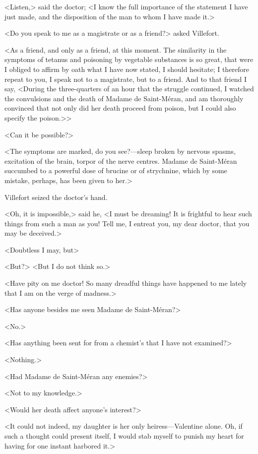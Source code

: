  <Listen,> said the doctor; <I know the full importance of the statement I have just made, and the disposition of the man to whom I have made it.> 

 <Do you speak to me as a magistrate or as a friend?> asked Villefort. 

 <As a friend, and only as a friend, at this moment. The similarity in the symptoms of tetanus and poisoning by vegetable substances is so great, that were I obliged to affirm by oath what I have now stated, I should hesitate; I therefore repeat to you, I speak not to a magistrate, but to a friend. And to that friend I say, <During the three-quarters of an hour that the struggle continued, I watched the convulsions and the death of Madame de Saint-Méran, and am thoroughly convinced that not only did her death proceed from poison, but I could also specify the poison.>> 

 <Can it be possible?> 

 <The symptoms are marked, do you see?—sleep broken by nervous spasms, excitation of the brain, torpor of the nerve centres. Madame de Saint-Méran succumbed to a powerful dose of brucine or of strychnine, which by some mistake, perhaps, has been given to her.> 

 Villefort seized the doctor's hand. 

 <Oh, it is impossible,> said he, <I must be dreaming! It is frightful to hear such things from such a man as you! Tell me, I entreat you, my dear doctor, that you may be deceived.> 

 <Doubtless I may, but\longdash> 

 <But?>  <But I do not think so.> 

 <Have pity on me doctor! So many dreadful things have happened to me lately that I am on the verge of madness.> 

 <Has anyone besides me seen Madame de Saint-Méran?> 

 <No.> 

 <Has anything been sent for from a chemist's that I have not examined?> 

 <Nothing.> 

 <Had Madame de Saint-Méran any enemies?> 

 <Not to my knowledge.> 

 <Would her death affect anyone's interest?> 

 <It could not indeed, my daughter is her only heiress—Valentine alone. Oh, if such a thought could present itself, I would stab myself to punish my heart for having for one instant harbored it.> 

